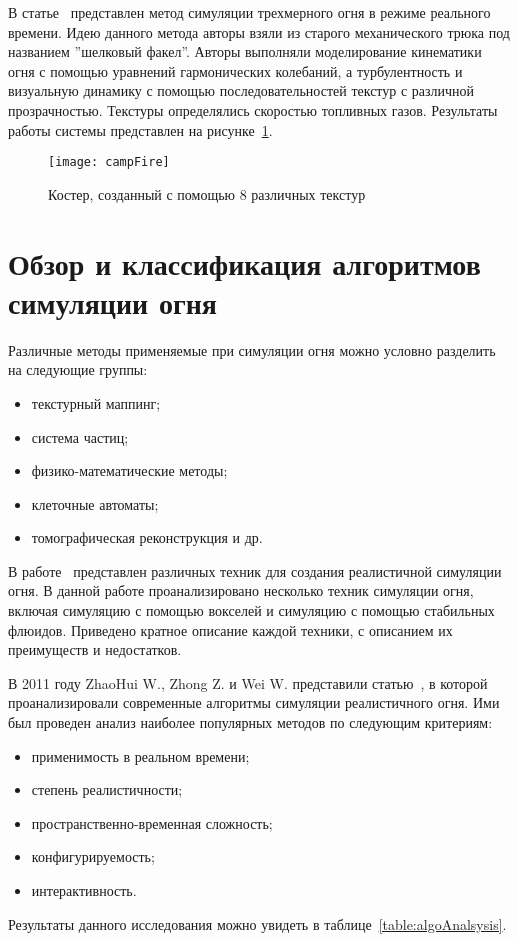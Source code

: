 В статье~\cite{SpringMass} представлен метод симуляции трехмерного огня в режиме
реального времени. Идею данного метода авторы взяли из старого механического
трюка под названием ''шелковый факел''. Авторы выполняли моделирование
кинематики огня с помощью уравнений гармонических колебаний, а турбулентность и
визуальную динамику с помощью последовательностей текстур с различной
прозрачностью. Текстуры определялись скоростью топливных газов. Результаты
работы системы представлен на рисунке~\ref{fig:campFire}.
\begin{figure}[htb]
	\centering
    \texttt{[image: campFire]}
    \caption{Костер, созданный с помощью 8 различных текстур}%
    \label{fig:campFire}
\end{figure}

\section{Обзор и классификация алгоритмов симуляции огня}

Различные методы применяемые при симуляции огня можно условно разделить на
следующие группы:
\begin{itemize}
	\item текстурный маппинг;
	\item система частиц;
	\item физико-математические методы;
	\item клеточные автоматы;
	\item томографическая реконструкция и др.
\end{itemize}

В работе~\cite{realistic_sim} представлен различных техник для создания
реалистичной симуляции огня. В данной работе проанализировано несколько техник
симуляции огня, включая симуляцию с помощью вокселей и симуляцию с помощью
стабильных флюидов. Приведено кратное описание каждой техники, с описанием их
преимуществ и недостатков.

В 2011 году ZhaoHui W., Zhong Z. и Wei W. представили статью~\cite{survey}, в
которой проанализировали современные алгоритмы симуляции реалистичного огня. Ими
был проведен анализ наиболее популярных методов по следующим критериям:
\begin{itemize}
	\item применимость в реальном времени;
	\item степень реалистичности;
	\item пространственно-временная сложность;
	\item конфигурируемость;
	\item интерактивность.
\end{itemize}
Результаты данного исследования можно увидеть в таблице~\ref{table:algoAnalsysis}.

